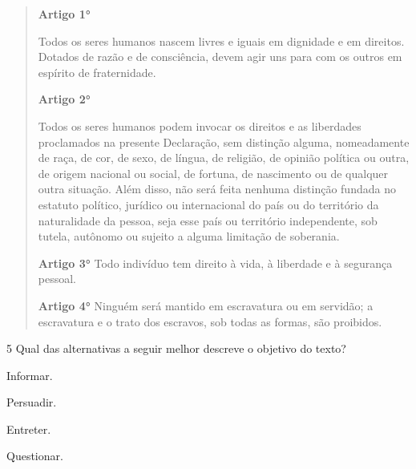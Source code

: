 \begin{quote}
\noindent\textbf{Artigo 1°}

\noindent Todos os seres humanos nascem livres e iguais em dignidade e em
direitos. Dotados de razão e de consciência, devem agir uns para com os
outros em espírito de fraternidade.

\noindent\textbf{Artigo 2°}

\noindent Todos os seres humanos podem invocar os direitos e as liberdades
proclamados na presente Declaração, sem distinção alguma, nomeadamente
de raça, de cor, de sexo, de língua, de religião, de opinião política ou
outra, de origem nacional ou social, de fortuna, de nascimento ou de
qualquer outra situação. Além disso, não será feita nenhuma distinção
fundada no estatuto político, jurídico ou internacional do país ou do
território da naturalidade da pessoa, seja esse país ou território
independente, sob tutela, autônomo ou sujeito a alguma limitação de
soberania.

\noindent\textbf{Artigo 3°}
\noindent Todo indivíduo tem direito à vida, à liberdade e à segurança pessoal.

\noindent\textbf{Artigo 4°}
\noindent Ninguém será mantido em escravatura ou em servidão; a escravatura e o
trato dos escravos, sob todas as formas, são proibidos.

\end{quote}

\num{5} Qual das alternativas a seguir melhor descreve o objetivo do texto?

\begin{escolha}
\item Informar.
\item Persuadir.
\item Entreter.
\item Questionar.
\end{escolha}



